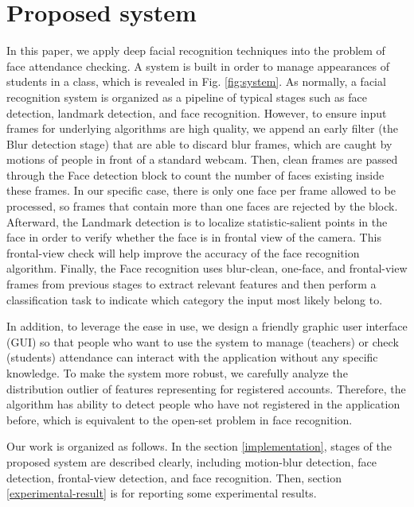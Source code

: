 \documentclass[journal, twocolumn]{IEEEtran}
\begin{document}
\medskip
\section{Proposed system}
\label{proposed-system}

In this paper, we apply deep facial recognition techniques into the problem of face attendance checking. A system is built in order to manage appearances of students in a class, which is revealed in Fig. \ref{fig:system}. As normally, a facial recognition system is organized as a pipeline of typical stages such as face detection, landmark detection, and face recognition. However, to ensure input frames for underlying algorithms are high quality, we append an early filter (the Blur detection stage) that are able to discard blur frames, which are caught by motions of people in front of a standard webcam. Then, clean frames are passed through the Face detection block to count the number of faces existing inside these frames. In our specific case, there is only one face per frame allowed to be processed, so frames that contain more than one faces are rejected by the block. Afterward, the Landmark detection is to localize statistic-salient points in the face in order to verify whether the face is in frontal view of the camera. This frontal-view check will help improve the accuracy of the face recognition algorithm. Finally, the Face recognition uses blur-clean, one-face, and frontal-view frames from previous stages to extract relevant features and then perform a classification task to indicate which category the input most likely belong to.

In addition, to leverage the ease in use, we design a friendly graphic user interface (GUI) so that people who want to use the system to manage (teachers) or check (students) attendance can interact with the application without any specific knowledge. To make the system more robust, we carefully analyze the distribution outlier of features representing for registered accounts. Therefore, the algorithm has ability to detect people who have not registered in the application before, which is equivalent to the open-set problem in face recognition.

Our work is organized as follows. In the section \ref{implementation}, stages of the proposed system are described clearly, including motion-blur detection, face detection, frontal-view detection, and face recognition. Then, section \ref{experimental-result} is for reporting some experimental results.
\end{document}
